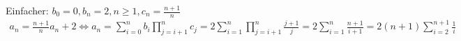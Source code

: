 
\begin{solution}

	Einfacher: $b_0 = 0, b_n = 2, n \geq 1, c_n = \frac{n+1}{n}$\\
	\begin{align*}
		a_n = \frac{n+1}{n}a_n + 2 \iff a_n = \sum_{i=0}^nb_i\prod_{j=i+1}^nc_j
		= 2\sum_{i=1}^n\prod_{j=i+1}^n\frac{j+1}{j} = 2\sum_{i=1}^n\frac{n+1}{i+1}
		= 2(n+1)\sum_{i=2}^{n+1}\frac{1}{i}
	\end{align*}
\end{solution}
